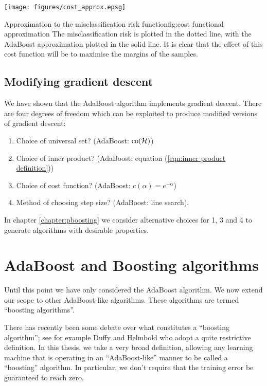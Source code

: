 \begin{linefigure}
\begin{center}
\texttt{[image: figures/cost\_approx.epsg]}
\end{center}
\begin{capt}{Approximation to the misclassification risk
function}{fig:cost functional approximation}
The misclassification risk is plotted in the dotted line, with the
AdaBoost approximation plotted in the solid line.  It is clear that
the effect of this cost function will be to maximise the margins of
the samples.
\end{capt}
\end{linefigure}

\subsection{Modifying gradient descent}

We have shown that the AdaBoost algorithm implements gradient descent.
There are four degrees of freedom which can be exploited to produce
modified versions of gradient descent:
%
\begin{enumerate}
\item	Choice of universal set? (AdaBoost: $\mathrm{co}(\mathcal{H})$)
\item	Choice of inner product? (AdaBoost: equation (\ref{eqn:inner
	product definition}))
\item	Choice of cost function? (AdaBoost: $c(\alpha) =
	e^{-\alpha}$)
\item	Method of choosing step size? (AdaBoost: line search).
\end{enumerate}
%
In chapter \ref{chapter:pboosting} we consider alternative choices for
1, 3 and 4 to generate algorithms with desirable properties.


\section{AdaBoost and Boosting algorithms}

Until this point we have only considered the AdaBoost algorithm.  We
now extend our scope to other AdaBoost-like algorithms.  These
algorithms are termed ``boosting algorithms''.

There has recently been some debate over what constitutes a ``boosting
algorithm''; see for example Duffy and Helmbold \cite{Duffy99} who
adopt a quite restrictive definition.  In this thesis, we take a very
broad definition, allowing any learning machine that is operating in
an ``AdaBoost-like'' manner to be called a ``boosting'' algorithm.  In
particular, we don't require that the training error be guaranteed to
reach zero.


